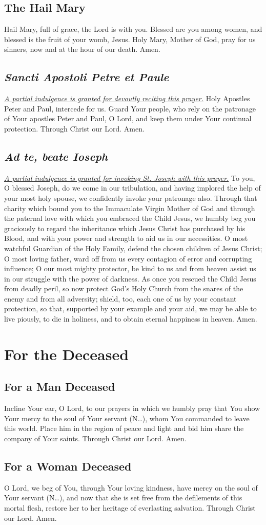 \documentclass[12pt]{article}
\newcommand{\prayersection}[1]{\section{#1}}
\newcommand{\prayertitle}[1]{\subsection{#1}}
\newcommand{\indulgencedprayertitle}[1]{\prayertitle{#1 \protect\kreuz}}
\newcommand{\insertname}{(N\dots)}
\newcommand{\foreign}[1]{\textsl{#1}}
\newcommand{\note}[1]{{\small{\textsl{#1}}}\newline}
\newcommand{\linkednote}[2]{\hyperlink{#1}{\note{#2}}}
\begin{document}
\prayertitle{The Hail Mary}
Hail Mary, full of grace, the Lord is with you.
Blessed are you among women, and blessed is the fruit of your womb, Jesus.
Holy Mary, Mother of God, pray for us sinners, now and at the hour of our death.
Amen.

\indulgencedprayertitle{\foreign{Sancti Apostoli Petre et Paule}}
\linkednote{grant20}{A partial indulgence is granted for devoutly reciting this prayer.}
Holy Apostles Peter and Paul, intercede for us.
Guard Your people, who rely on the patronage of Your apostles Peter and Paul, O Lord, and keep them under Your continual protection.
Through Christ our Lord. Amen.

\indulgencedprayertitle{\foreign{Ad te, beate Ioseph}}
\linkednote{grant19}{A partial indulgence is granted for invoking St. Joseph with this prayer.}
To you, O blessed Joseph, do we come in our tribulation, and having implored the help of your most holy spouse, we confidently invoke your patronage also.
Through that charity which bound you to the Immaculate Virgin Mother of God and through the paternal love with which you embraced the Child Jesus, we humbly beg you graciously to regard the inheritance which Jesus Christ has purchased by his Blood, and with your power and strength to aid us in our necessities.
O most watchful Guardian of the Holy Family, defend the chosen children of Jesus Christ;
O most loving father, ward off from us every contagion of error and corrupting influence;
O our most mighty protector, be kind to us and from heaven assist us in our struggle with the power of darkness.
As once you rescued the Child Jesus from deadly peril, so now protect God’s Holy Church from the snares of the enemy and from all adversity;
shield, too, each one of us by your constant protection, so that, supported by your example and your aid, we may be able to live piously, to die in holiness, and to obtain eternal happiness in heaven.
Amen.

\newpage

\prayersection{For the Deceased}

\prayertitle{For a Man Deceased}
Incline Your ear, O Lord, to our prayers in which we humbly pray that You show Your mercy to the soul of Your servant \insertname, whom You commanded to leave this world.
Place him in the region of peace and light and bid him share the company of Your saints.
Through Christ our Lord. Amen.

\prayertitle{For a Woman Deceased}
O Lord, we beg of You, through Your loving kindness, have mercy on the soul of Your servant \insertname, and now that she is set free from the defilements of this mortal flesh, restore her to her heritage of everlasting salvation.
Through Christ our Lord. Amen.
\end{document}
